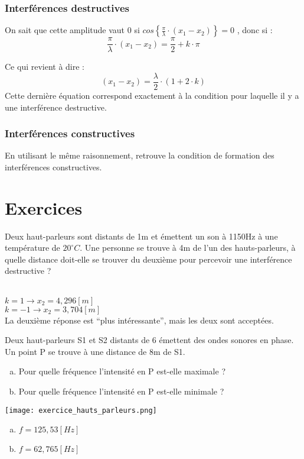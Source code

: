 \subsubsection{Interférences destructives}
On sait que cette amplitude vaut \(0\) si \(cos \left \lbrace \frac{\pi}{\lambda}\cdot (x_1-x_2) \right \rbrace = 0\) , donc si :
\begin{equation}
    \frac{\pi}{\lambda}\cdot (x_1-x_2) = \frac{\pi}{2}+k \cdot \pi
\end{equation}

Ce qui revient à dire :
\begin{equation}
    (x_1-x_2) = \frac{\lambda}{2} \cdot (1+2\cdot k )
\end{equation}
Cette dernière équation correspond exactement à la condition pour laquelle il y a une interférence destructive.

\subsubsection{Interférences constructives}
En utilisant le même raisonnement, retrouve la condition de formation des interférences constructives.

\newpage

\section{Exercices}
\begin{exercise}
    Deux haut-parleurs sont distants de 1m et émettent un son à 1150Hz à une température de \(20^\circ C\). Une personne se trouve à 4m de l'un des hauts-parleurs, à quelle distance doit-elle se trouver du deuxième pour percevoir une interférence destructive ?
\end{exercise}
\begin{solution}\\
    \(k=1 \rightarrow x_2=4,296[m]\)\\
    \(k=-1 \rightarrow x_2=3,704[m]\)\\
    La deuxième réponse est \enquote{plus intéressante}, mais les deux sont acceptées.
\end{solution}

\begin{exercise}
    Deux haut-parleurs S1 et S2 distants de 6 émettent des ondes sonores en phase. Un point P se trouve à une distance de 8m de S1.
    \begin{enumerate}[a)]
        \item Pour quelle fréquence l'intensité en P est-elle maximale ?
        \item Pour quelle fréquence l'intensité en P est-elle minimale ?
    \end{enumerate}
    \texttt{[image: exercice\_hauts\_parleurs.png]}
\end{exercise}
\begin{solution}
    \begin{enumerate}[a)]
        \item \(f=125,53[Hz]\)
        \item \(f=62,765[Hz]\)
    \end{enumerate}
\end{solution}

